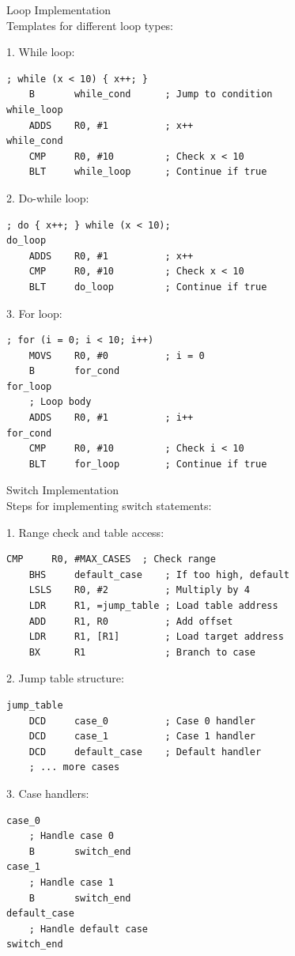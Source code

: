 \begin{KR}{Loop Implementation}\\
Templates for different loop types:

1. While loop:
\begin{lstlisting}[language=armasm, style=base]
    ; while (x < 10) { x++; }
    B       while_cond      ; Jump to condition
while_loop
    ADDS    R0, #1          ; x++
while_cond
    CMP     R0, #10         ; Check x < 10
    BLT     while_loop      ; Continue if true
\end{lstlisting}

2. Do-while loop:
\begin{lstlisting}[language=armasm, style=base]
    ; do { x++; } while (x < 10);
do_loop
    ADDS    R0, #1          ; x++
    CMP     R0, #10         ; Check x < 10
    BLT     do_loop         ; Continue if true
\end{lstlisting}

3. For loop:
\begin{lstlisting}[language=armasm, style=base]
    ; for (i = 0; i < 10; i++)
    MOVS    R0, #0          ; i = 0
    B       for_cond
for_loop
    ; Loop body
    ADDS    R0, #1          ; i++
for_cond
    CMP     R0, #10         ; Check i < 10
    BLT     for_loop        ; Continue if true
\end{lstlisting}
\end{KR}

\begin{KR}{Switch Implementation}\\
Steps for implementing switch statements:

1. Range check and table access:
\begin{lstlisting}[language=armasm, style=base]
    CMP     R0, #MAX_CASES  ; Check range
    BHS     default_case    ; If too high, default
    LSLS    R0, #2          ; Multiply by 4
    LDR     R1, =jump_table ; Load table address
    ADD     R1, R0          ; Add offset
    LDR     R1, [R1]        ; Load target address
    BX      R1              ; Branch to case
\end{lstlisting}

2. Jump table structure:
\begin{lstlisting}[language=armasm, style=base]
jump_table
    DCD     case_0          ; Case 0 handler
    DCD     case_1          ; Case 1 handler
    DCD     default_case    ; Default handler
    ; ... more cases
\end{lstlisting}

3. Case handlers:
\begin{lstlisting}[language=armasm, style=base]
case_0
    ; Handle case 0
    B       switch_end
case_1
    ; Handle case 1
    B       switch_end
default_case
    ; Handle default case
switch_end
\end{lstlisting}
\end{KR}

